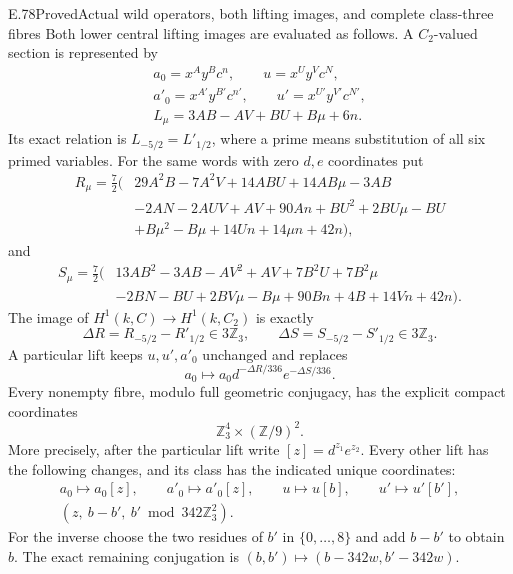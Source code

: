 \begin{statement}{E.78}{Proved}{Actual wild operators, both lifting images, and complete class-three fibres}
Both lower central lifting images are evaluated as
follows. A $C_2$-valued section is represented by
\[
 \begin{gathered}
 a_0=x^A y^B c^n,\qquad u=x^U y^V c^N,\\
 a'_0=x^{A'}y^{B'}c^{n'},\qquad
 u'=x^{U'}y^{V'}c^{N'},\\
 L_\mu=3AB-AV+BU+B\mu+6n.
 \end{gathered}
 \tag{E78.9}
\]
Its exact relation is $L_{-5/2}=L'_{1/2}$, where a
prime means substitution of all six primed variables.
For the same words with zero $d,e$ coordinates put
\[
 \begin{aligned}
 R_\mu=\frac72\big(&29A^2B-7A^2V+14ABU+14AB\mu-3AB\\
 &-2AN-2AUV+AV+90An+BU^2+2BU\mu-BU\\
 &+B\mu^2-B\mu+14Un+14\mu n+42n\big),
 \end{aligned}
 \tag{E78.10}
\]
and
\[
 \begin{aligned}
 S_\mu=\frac72\big(&13AB^2-3AB-AV^2+AV+7B^2U+7B^2\mu\\
 &-2BN-BU+2BV\mu-B\mu+90Bn+4B+14Vn+42n\big).
 \end{aligned}
 \tag{E78.11}
\]
The image of $H^1(k,C)\to H^1(k,C_2)$ is exactly
\[
 \Delta R=R_{-5/2}-R'_{1/2}\in3\mathbb Z_3,\qquad
 \Delta S=S_{-5/2}-S'_{1/2}\in3\mathbb Z_3.
 \tag{E78.12}
\]
A particular lift keeps $u,u',a'_0$ unchanged and
replaces
\[
           a_0\longmapsto
              a_0d^{-\Delta R/336}e^{-\Delta S/336}.
 \tag{E78.13}
\]
Every nonempty fibre, modulo full geometric conjugacy,
has the explicit compact coordinates
\[
                  \mathbb Z_3^4\times(\mathbb Z/9)^2.
 \tag{E78.14}
\]
More precisely, after the particular lift write
$[z]=d^{z_1}e^{z_2}$. Every other lift has the
following changes, and its class has the indicated
unique coordinates:
\[
 \begin{gathered}
 a_0\mapsto a_0[z],\qquad a'_0\mapsto a'_0[z],
 \qquad u\mapsto u[b],\qquad u'\mapsto u'[b'],\\
 (z,\ b-b',\ b'\bmod342\mathbb Z_3^2).
 \end{gathered}
 \tag{E78.15}
\]
For the inverse choose the two residues of $b'$ in
$\{0,\ldots,8\}$ and add $b-b'$ to obtain $b$.
The exact remaining conjugation is
$(b,b')\mapsto(b-342w,b'-342w)$.


\end{statement}
